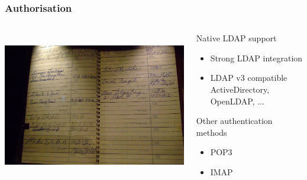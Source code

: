 \documentclass{beamer}
\begin{document}
\begin{frame}
    \frametitle{Authorisation}


 \begin{columns}
 \begin{column}{0.34\textwidth}
    \includegraphics[height=6.5cm]{pics/addressbook.jpg}
 \end{column}
 \begin{column}{0.90\textwidth}
    \begin{block}{Native LDAP support}
        \begin{itemize}
            \item Strong LDAP integration
            \item LDAP v3 compatible \\
            {\small ActiveDirectory, OpenLDAP, ...}
        \end{itemize}
    \end{block}

    \begin{block}{Other authentication methods}
        \begin{itemize}
            \item POP3
            \item IMAP
        \end{itemize}
    \end{block}
 \end{column}
\end{columns}
\end{frame}
\end{document}
